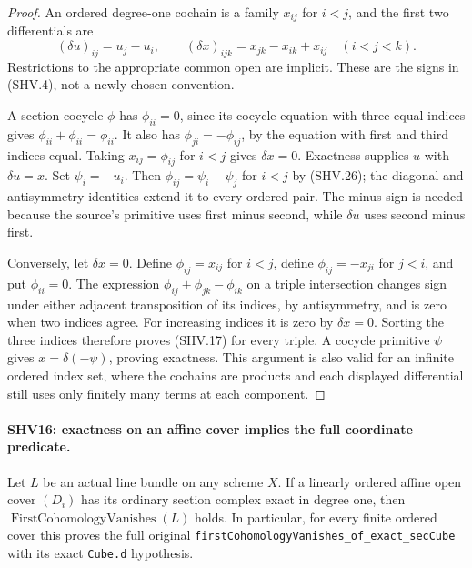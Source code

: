 \begin{proof}
An ordered degree-one cochain is a family $x_{ij}$ for $i<j$,
and the first two differentials are
\[
 (\delta u)_{ij}=u_j-u_i,\qquad
 (\delta x)_{ijk}=x_{jk}-x_{ik}+x_{ij}\quad(i<j<k).
                                                        \tag{SHV.26}
\]
Restrictions to the appropriate common open are implicit.
These are the signs in (SHV.4), not a newly chosen convention.

A section cocycle $\phi$ has $\phi_{ii}=0$, since its
cocycle equation with three equal indices gives
$\phi_{ii}+\phi_{ii}=\phi_{ii}$.  It also has
$\phi_{ji}=-\phi_{ij}$, by the equation with first and third
indices equal.  Taking $x_{ij}=\phi_{ij}$ for $i<j$ gives
$\delta x=0$.  Exactness supplies $u$ with $\delta u=x$.
Set $\psi_i=-u_i$.  Then
$\phi_{ij}=\psi_i-\psi_j$ for $i<j$ by (SHV.26);
the diagonal and antisymmetry identities extend it to every
ordered pair.  The minus sign is needed because the source's
primitive uses first minus second, while $\delta u$ uses
second minus first.

Conversely, let $\delta x=0$.  Define $\phi_{ij}=x_{ij}$
for $i<j$, define $\phi_{ij}=-x_{ji}$ for $j<i$, and put
$\phi_{ii}=0$.  The expression
$\phi_{ij}+\phi_{jk}-\phi_{ik}$ on a triple intersection
changes sign under either adjacent transposition of its
indices, by antisymmetry, and is zero when two indices agree.
For increasing indices it is zero by $\delta x=0$.
Sorting the three indices therefore proves (SHV.17) for
every triple.  A cocycle primitive $\psi$ gives
$x=\delta(-\psi)$, proving exactness.  This argument is also
valid for an infinite ordered index set, where the cochains
are products and each displayed differential still uses only
finitely many terms at each component.
\end{proof}

\paragraph{SHV16: exactness on an affine cover implies the full coordinate predicate.}
\label{claim:SHV16}
Let $L$ be an actual line bundle on any scheme $X$.
If a linearly ordered affine open cover $(D_i)$ has its
ordinary section complex exact in degree one, then
$\operatorname{FirstCohomologyVanishes}(L)$ holds.
In particular, for every finite ordered cover this proves
the full original
\texttt{firstCohomologyVanishes\_\allowbreak of\_\allowbreak exact\_\allowbreak secCube}
with its exact \texttt{Cube.d} hypothesis.

